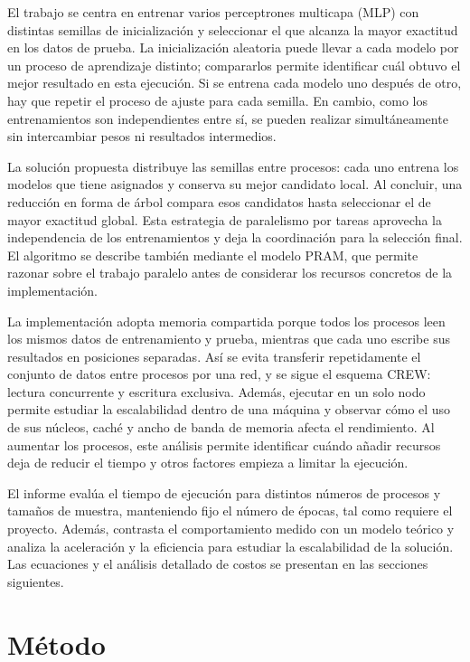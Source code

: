 \documentclass[11pt, a4paper]{article}
\begin{document}
El trabajo se centra en entrenar varios perceptrones multicapa (MLP) con distintas semillas de inicialización y seleccionar el que alcanza la mayor exactitud en los datos de prueba. La inicialización aleatoria puede llevar a cada modelo por un proceso de aprendizaje distinto; compararlos permite identificar cuál obtuvo el mejor resultado en esta ejecución. Si se entrena cada modelo uno después de otro, hay que repetir el proceso de ajuste para cada semilla. En cambio, como los entrenamientos son independientes entre sí, se pueden realizar simultáneamente sin intercambiar pesos ni resultados intermedios.

La solución propuesta distribuye las semillas entre procesos: cada uno entrena los modelos que tiene asignados y conserva su mejor candidato local. Al concluir, una reducción en forma de árbol compara esos candidatos hasta seleccionar el de mayor exactitud global. Esta estrategia de paralelismo por tareas aprovecha la independencia de los entrenamientos y deja la coordinación para la selección final. El algoritmo se describe también mediante el modelo PRAM, que permite razonar sobre el trabajo paralelo antes de considerar los recursos concretos de la implementación.

La implementación adopta memoria compartida porque todos los procesos leen los mismos datos de entrenamiento y prueba, mientras que cada uno escribe sus resultados en posiciones separadas. Así se evita transferir repetidamente el conjunto de datos entre procesos por una red, y se sigue el esquema CREW: lectura concurrente y escritura exclusiva. Además, ejecutar en un solo nodo permite estudiar la escalabilidad dentro de una máquina y observar cómo el uso de sus núcleos, caché y ancho de banda de memoria afecta el rendimiento. Al aumentar los procesos, este análisis permite identificar cuándo añadir recursos deja de reducir el tiempo y otros factores empieza a limitar la ejecución.

El informe evalúa el tiempo de ejecución para distintos números de procesos y tamaños de muestra, manteniendo fijo el número de épocas, tal como requiere el proyecto. Además, contrasta el comportamiento medido con un modelo teórico y analiza la aceleración y la eficiencia para estudiar la escalabilidad de la solución. Las ecuaciones y el análisis detallado de costos se presentan en las secciones siguientes.


\section{Método}
\end{document}
